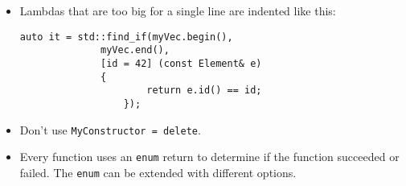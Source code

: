 \documentclass{article}
\begin{document}
\begin{itemize}
    \item Lambdas that are too big for a single line are indented like this:
          \begin{Verbatim}[fontsize=\small]
              auto it = std::find_if(myVec.begin(),
              myVec.end(),
              [id = 42] (const Element& e)
              {
                      return e.id() == id;
                  });
          \end{Verbatim}
    \item Don't use \texttt{MyConstructor = delete}.
    \item Every function uses an \texttt{enum} return to determine if the function succeeded or failed. The \texttt{enum} can be extended with different options.
\end{itemize}
\end{document}
